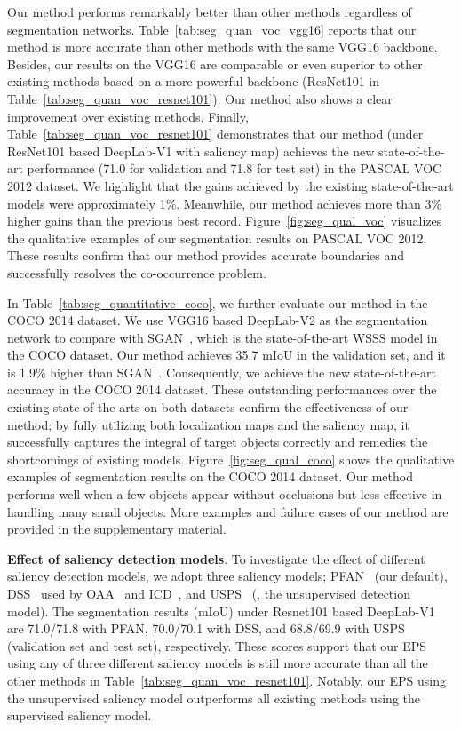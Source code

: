 \documentclass[final]{cvpr}
\begin{document}
Our method performs remarkably better than other methods regardless of segmentation networks. Table~\ref{tab:seg_quan_voc_vgg16} reports that our method is more accurate than other methods with the same VGG16 backbone. Besides, our results on the VGG16 are comparable or even superior to other existing methods based on a more powerful backbone (\ie ResNet101 in Table~\ref{tab:seg_quan_voc_resnet101}). Our method also shows a clear improvement over existing methods. Finally, Table~\ref{tab:seg_quan_voc_resnet101} demonstrates that our method (under ResNet101 based DeepLab-V1 with saliency map) achieves the new state-of-the-art performance (71.0 for validation and 71.8 for test set) in the PASCAL VOC 2012 dataset. We highlight that the gains achieved by the existing state-of-the-art models were approximately 1\%. Meanwhile, our method achieves more than 3\% higher gains than the previous best record. Figure~\ref{fig:seg_qual_voc} visualizes the qualitative examples of our segmentation results on PASCAL VOC 2012. These results confirm that our method provides accurate boundaries and successfully resolves the co-occurrence problem. 


In Table~\ref{tab:seg_quantitative_coco}, we further evaluate our method in the COCO 2014 dataset. We use VGG16 based DeepLab-V2 as the segmentation network to compare with SGAN~\cite{yao2020saliency}, which is the state-of-the-art WSSS model in the COCO dataset. Our method achieves 35.7 mIoU in the validation set, and it is 1.9\% higher than SGAN~\cite{yao2020saliency}. Consequently, we achieve the new state-of-the-art accuracy in the COCO 2014 dataset. These outstanding performances over the existing state-of-the-arts on both datasets confirm the effectiveness of our method; by fully utilizing both localization maps and the saliency map, it successfully captures the integral of target objects correctly and remedies the shortcomings of existing models. Figure~\ref{fig:seg_qual_coco} shows the qualitative examples of segmentation results on the COCO 2014 dataset. Our method performs well when a few objects appear without occlusions but less effective in handling many small objects. More examples and failure cases of our method are provided in the supplementary material.

\vspace{1mm}
\noindent \textbf{Effect of saliency detection models}. To investigate the effect of different saliency detection models, we adopt three saliency models; PFAN~\cite{zhao2019pyramid} (our default), DSS~\cite{hou2017deeply} used by OAA~\cite{jiang2019integral} and ICD~\cite{fan2020learning}, and USPS~\cite{nguyen2019deepusps} (\ie, the unsupervised detection model). The segmentation results (mIoU) under Resnet101 based DeepLab-V1 are 71.0/71.8 with PFAN, 70.0/70.1 with DSS, and 68.8/69.9 with USPS (validation set and test set), respectively. These scores support that our EPS using any of three different saliency models is still more accurate than all the other methods in Table~\ref{tab:seg_quan_voc_resnet101}. Notably, our EPS using the unsupervised saliency model outperforms all existing methods using the supervised saliency model. 
\end{document}
